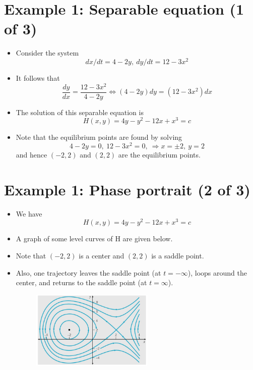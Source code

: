 \documentclass[11pt,a4paper]{article}
\begin{document}
	\section*{Example 1: Separable equation (1 of 3)}
	\begin{itemize}
		\item Consider the system
		$$
		dx/dt = 4-2y,\ dy/dt = 12-3x^2
		$$
		\item It follows that
		$$
		\frac{dy}{dx} = \frac{12 - 3x^2}{4-2y}\Leftrightarrow (4-2y)dy = (12-3x^2)dx
		$$
		\item The solution of this separable equation is
		$$
		H(x,y) = 4y-y^2-12x+x^3=c
		$$
		\item Note that the equilibrium points are found by solving
		$$
		4-2y = 0,\ 12-3x^2=0,\ \Rightarrow x = \pm 2,\ y = 2
		$$
		and hence $(-2, 2)$ and $(2, 2)$ are the equilibrium points.
	\end{itemize}
	\section*{Example 1: Phase portrait (2 of 3)}
	\begin{itemize}
		\item We have
		$$
		H(x,y)=4y-y^2-12x+x^3=c
		$$
		\item A graph of some level curves of H are given below.
		\item Note that $(-2, 2)$ is a center and $(2, 2)$ is a saddle point.
		\item Also, one trajectory leaves the saddle point (at $t = -\infty$), loops around the center, and returns to the saddle point (at $t = \infty$).
		\begin{figure}[H]
			\centering
				\includegraphics[width=0.55\textwidth]{figure/Lec16f2.PNG}
		\end{figure}
	\end{itemize}
\end{document}
